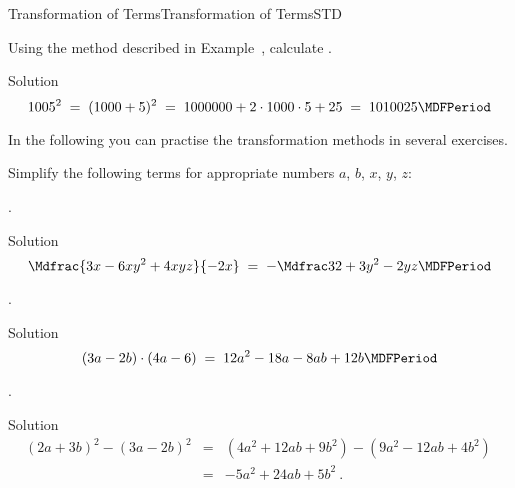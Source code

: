 \begin{MXContent}{Transformation of Terms}{Transformation of Terms}{STD}
\begin{MExercise}%
Using the method described in Example~, calculate
.


\begin{MHint}{Solution}
$$1005^2 \;=\; (1000+5)^2\;=\; 1000000+2\cdot 1000\cdot 5+25 \;=\; 1010025 \MDFPeriod $$\end{MHint}
\end{MExercise}

In the following  you can practise the transformation methods in several exercises.

\end{MXContent}

\begin{MExercises}
\begin{MExercise}
Simplify the following terms for appropriate numbers $a$, $b$, $x$, $y$, $z$:
\begin{MExerciseItems}
\item{. \begin{MHint}{Solution}$$\Mdfrac{3x -6x y^2+4 x y z}{-2x}\;=\; -\Mdfrac32+3y^2-2y z \MDFPeriod  $$\end{MHint}}
\item{. \begin{MHint}{Solution} $$(3a-2b)\cdot(4a-6)\;=\; 12a^2-18a-8a b+12b\MDFPeriod  $$\end{MHint}}
\item{. \begin{MHint}{Solution} \begin{eqnarray*}(2a+3b)^2-(3a-2b)^2&=& (4a^2+12a b+9b^2)-(9a^2-12a b+4b^2)\ \\ &=& -5a^2+24a b+5b^2  \: . \end{eqnarray*}\end{MHint}}

\end{MExerciseItems}
\end{MExercise}
\end{MExercises}
